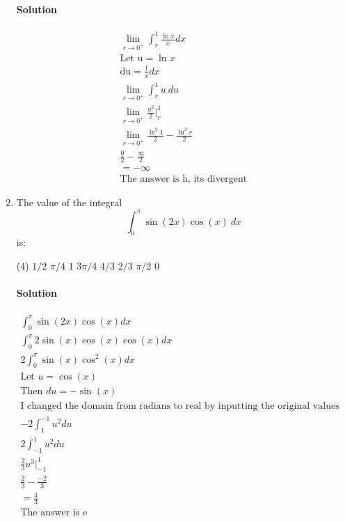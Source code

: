 \documentclass[MATH-115-Notes.tex]{subfiles}
\begin{document}
\begin{enumerate}[itemsep=5mm]
    \paragraph*{Solution}
    \begin{gather*}
        \lim_{r \to 0^+}\int_{r}^{1}\frac{\ln x}{x}dx\\ 
        \text{Let u} = \ln x\\
        \text{du} = \frac{1}{x}dx\\
        \lim_{r \to 0^+} \int_{r}^{1}u\ du\\
        \lim_{r \to 0^+} \frac{u^2}{2}\Big|_r^1\\
        \lim_{r \to 0^+} \frac{\ln^2 1}{2} - \frac{\ln^2 r}{2}\\
        \frac{0}{2}-\frac{\infty}{2}\\
        = -\infty\\
        \text{The answer is h, its divergent}
    \end{gather*}
    
    \item The value of the integral \[\int_{0}^{\pi}\sin(2x)\cos(x)\ dx\] is:
    \begin{tasks}(4)
        \task \(1/2\)
        \task \(\pi/4\)
        \task \(1\)
        \task \(3\pi/4\)
        \task \(4/3\)
        \task \(2/3\)
        \task \(\pi/2\)
        \task \(0\)
    \end{tasks}
    \paragraph*{Solution}
    \begin{gather*}
        \int_{0}^{\pi}\sin(2x)\cos(x)dx\\
        \int_{0}^{\pi}2\sin(x)\cos(x)\cos(x)dx\\
        2\int_{0}^{\pi}\sin(x)\cos^2(x)dx\\
        \text{Let } u = \cos(x)\\
        \text{Then } du = -\sin(x)\\
        \text{I changed the domain from radians to real by inputting the original values into cos(x) to get 1 and -1.}\\
        -2\int_{1}^{-1}u^2du\\
        2\int_{-1}^{1}u^2du\\
        \frac{2}{3}u^3\Big|_{-1}^1\\
        \frac{2}{3}-\frac{-2}{3}\\
        = \frac{4}{3}\\
        \text{The answer is e}
    \end{gather*}
    \newpage


\end{enumerate}
\end{document}
